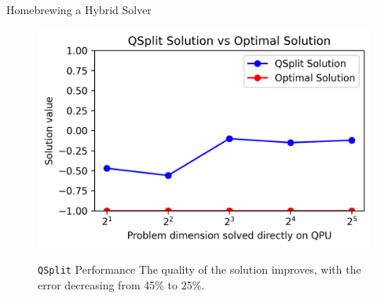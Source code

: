 \documentclass[final]{beamer}
\newlength{\colwidth}
\begin{document}
\begin{frame}[t,fragile]
\begin{columns}[t]
\begin{column}{\colwidth}
\begin{block}{Homebrewing a Hybrid Solver}
    \begin{figure}[h!]
      \centering
      \begin{minipage}{0.6\textwidth}
        \centering
        \includegraphics[height=0.15\textheight]{logos/sol.png}
      \end{minipage}%
      \hfill
      \begin{minipage}{0.35\textwidth}
        \begin{alertblock}{\texttt{QSplit} Performance}
          The quality of the solution improves, with the error decreasing from 45\% to 25\%.
        \end{alertblock}
      \end{minipage}
    \end{figure}


\end{block}
\end{column}
\end{columns}
\end{frame}
\end{document}

